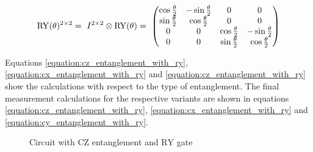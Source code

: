 \begin{equation}
     \centering
     \begin{split}
        \mathrm{RY}(\theta)^{2\times2} =\ I^{2\times2}\otimes\mathrm{RY}(\theta) =\  \begin{pmatrix}
        \cos{\frac{\theta}{2}} & -\sin{\frac{\theta}{2}} & 0 & 0\\
        \sin{\frac{\theta}{2}} & \cos{\frac{\theta}{2}} & 0 & 0 \\
        0 & 0 & \cos{\frac{\theta}{2}} & -\sin{\frac{\theta}{2}}\\
        0 & 0 & \sin{\frac{\theta}{2}} & \cos{\frac{\theta}{2}}\\
    \end{pmatrix}\\
     \end{split}
     \label{equation:2_x_2_ry}
 \end{equation}

Equations \ref{equation:cz_entanglement_with_ry}, \ref{equation:cx_entanglement_with_ry} and \ref{equation:cz_entanglement_with_ry} show the calculations with respect to the type of entanglement. The final measurement calculations for the respective variants are shown in equations \ref{equation:cz_entanglement_with_ry}, \ref{equation:cx_entanglement_with_ry} and \ref{equation:cy_entanglement_with_ry}.

\begin{figure}[!ht]
    \centering
    \caption{Circuit with $\mathrm{CZ}$ entanglement and $\mathrm{RY}$ gate}
    \label{fig:circuit_cz_entangled_ry_gate}
\end{figure}

